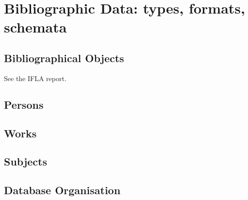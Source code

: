 
\section{Bibliographic Data: types, formats, schemata}
\label{sec:bibdata}


\subsection{Bibliographical Objects}
\label{sec:bibobject}

See the IFLA report.

\subsection{Persons}
\label{sec:persons}



\subsection{Works}
\label{sec:worksasobj}


\subsection{Subjects}
\label{sec:subjectsasobj}





\subsection{Database Organisation}
\label{sec:database}







